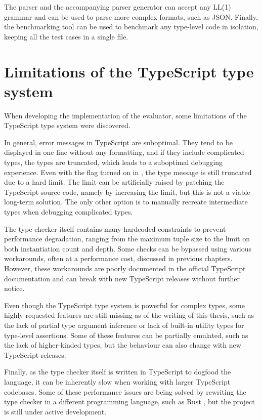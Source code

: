 The parser and the accompanying parser generator can accept any LL(1) grammar and can be used to parse more complex formats, such as JSON. Finally, the benchmarking tool can be used to benchmark any type-level code in isolation, keeping all the test cases in a single file.

\section{Limitations of the TypeScript type system}

When developing the implementation of the evaluator, some limitations of the TypeScript type system were discovered.

In general, error messages in TypeScript are suboptimal. They tend to be displayed in one line without any formatting, and if they include complicated types, the types are truncated, which leads to a suboptimal debugging experience. Even with the  flag turned on in , the type message is still truncated due to a hard limit. The limit can be artificially raised by patching the TypeScript source code, namely by increasing the  limit, but this is not a viable long-term solution. The only other option is to manually recreate intermediate types when debugging complicated types.

The type checker itself contains many hardcoded constraints to prevent performance degradation, ranging from the maximum tuple size to the limit on both instantiation count and depth. Some checks can be bypassed using various workarounds, often at a performance cost, discussed in previous chapters. However, these workarounds are poorly documented in the official TypeScript documentation and can break with new TypeScript releases without further notice.

Even though the TypeScript type system is powerful for complex types, some highly requested features are still missing as of the writing of this thesis, such as the lack of partial type argument inference \cite{ImplementPartialType} or lack of built-in utility types for type-level assertions. Some of these features can be partially emulated, such as the lack of higher-kinded types, but the behaviour can also change with new TypeScript releases.

Finally, as the type checker itself is written in TypeScript to dogfood the language, it can be inherently slow when working with larger TypeScript codebases. Some of these performance issues are being solved by rewriting the type checker in a different programming language, such as Rust \cite{Stc2023}, but the project is still under active development.


